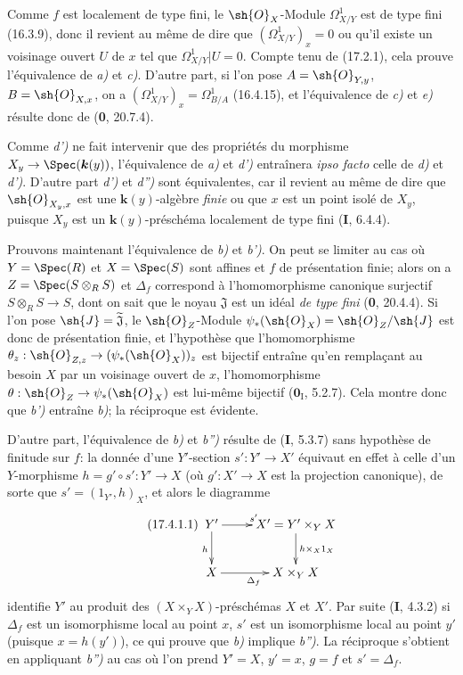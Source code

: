 Comme $f$ est localement de type fini, le $\sh{O}_X$-Module $\varOmega^1_{X/Y}$ est de type fini (16.3.9), donc il revient au même de dire que $(\varOmega^1_{X/Y})_x=0$ ou qu'il existe un voisinage ouvert $U$ de $x$ tel que $\varOmega^1_{X/Y}|U=0$. Compte tenu de (17.2.1), cela prouve l'équivalence de \emph{a)} et \emph{c)}. D'autre part, si l'on pose $A=\sh{O}_{Y,y}$, $B=\sh{O}_{X,x}$, on a $(\varOmega^1_{X/Y})_x=\Omega^1_{B/A}$ (16.4.15), et l'équivalence de \emph{c)} et \emph{e)} résulte donc de (\textbf{0}, 20.7.4).

Comme \emph{d')} ne fait intervenir que des propriétés du morphisme $X_y\to\Spec(\boldsymbol{k}(y))$, l'équivalence de \emph{a)} et \emph{d')} entraînera \emph{ipso facto} celle de \emph{d)} et \emph{d')}. D'autre part \emph{d')} et \emph{d'')} sont équivalentes, car il revient au même de dire que $\sh{O}_{X_y,x}$ est une $\boldsymbol{k}(y)$-algèbre \emph{finie} ou que $x$ est un point isolé de $X_y$, puisque $X_y$ est un $\boldsymbol{k}(y)$-préschéma localement de type fini (\textbf{I}, 6.4.4).

Prouvons maintenant l'équivalence de \emph{b)} et \emph{b')}. On peut se limiter au cas où $Y=\Spec(R)$ et $X=\Spec(S)$ sont affines et $f$ de présentation finie; alors on a $Z=\Spec(S\otimes_R S)$ et $\Delta_f$ correspond à l'homomorphisme canonique surjectif $S\otimes_R S\to S$, dont on sait que le noyau $\mathfrak{J}$ est un idéal \emph{de type fini} (\textbf{0}, 20.4.4). Si l'on pose $\sh{J}=\widetilde{\mathfrak{J}}$, le $\sh{O}_Z$-Module $\psi_*(\sh{O}_X)=\sh{O}_Z/\sh{J}$ est donc de présentation finie, et l'hypothèse que l'homomorphisme $\theta_z: \sh{O}_{Z,z}\to(\psi_*(\sh{O}_X))_z$ est bijectif entraîne qu'en remplaçant au besoin $X$ par un voisinage ouvert de $x$, l'homomorphisme $\theta:\sh{O}_Z\to\psi_*(\sh{O}_X)$ est lui-même bijectif ($\mathbf{0}_{\mathrm I}$, 5.2.7). Cela montre donc que \emph{b')} entraîne \emph{b)}; la réciproque est évidente.

D'autre part, l'équivalence de \emph{b)} et \emph{b'')} résulte de (\textbf{I}, 5.3.7) sans hypothèse de finitude sur $f$: la donnée d'une $Y'$-section $s':Y'\to X'$ équivaut en effet à celle d'un
$Y$-morphisme $h=g'\circ s':Y'\to X$ (où $g':X'\to X$ est la projection canonique), de sorte que $s'=(1_{Y'},h)_X$, et alors le diagramme
\[
\tag{17.4.1.1}
\label{IV.17.4.1.1}
\xymatrix{
Y' \ar[r]^{s'} \ar[d]_h & X'=Y'\times_Y X \ar[d]^{h\times_X 1_X}\\
X \ar[r]_{\Delta_f} & X\times_Y X
}
\]
identifie $Y'$ au produit des $(X\times_Y X)$-préschémas $X$ et $X'$. Par suite (\textbf{I}, 4.3.2) si $\Delta_f$ est un isomorphisme local au point $x$, $s'$ est un isomorphisme local au point $y'$ (puisque $x=h(y')$), ce qui prouve que \emph{b)} implique \emph{b'')}. La réciproque s'obtient en appliquant \emph{b'')} au cas où l'on prend $Y'=X$, $y'=x$, $g=f$ et $s'=\Delta_f$.

